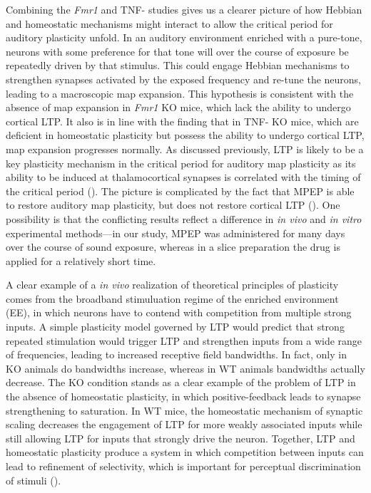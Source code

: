 Combining the \textit{Fmr1} and TNF-\textalpha{} studies gives us a clearer picture of how Hebbian and homeostatic mechanisms might interact to allow the critical period for auditory plasticity unfold. In an auditory environment enriched with a pure-tone, neurons with some preference for that tone will over the course of exposure be repeatedly driven by that stimulus. This could engage Hebbian mechanisms to strengthen synapses activated by the exposed frequency and re-tune the neurons, leading to a macroscopic map expansion. This hypothesis is consistent with the absence of map expansion in \textit{Fmr1} KO mice, which lack the ability to undergo cortical LTP. It also is in line with the finding that in TNF-\textalpha{} KO mice, which are deficient in homeostatic plasticity but possess the ability to undergo cortical LTP, map expansion progresses normally. As discussed previously, LTP is likely to be a key plasticity mechanism in the critical period for auditory map plasticity as its ability to be induced at thalamocortical synapses is correlated with the timing of the critical period (\cite{Chun2013}). The picture is complicated by the fact that MPEP is able to restore auditory map plasticity, but does not restore cortical LTP (\cite{Wilson2007}). One possibility is that the conflicting results reflect a difference in \textit{in vivo} and \textit{in vitro} experimental methods---in our study, MPEP was administered for many days over the course of sound exposure, whereas in a slice preparation the drug is applied for a relatively short time.

A clear example of a \textit{in vivo} realization of theoretical principles of plasticity comes from the broadband stimuluation regime of the enriched environment (EE), in which neurons have to contend with competition from multiple strong inputs. A simple plasticity model governed by LTP would predict that strong repeated stimulation would trigger LTP and strengthen inputs from a wide range of frequencies, leading to increased receptive field bandwidths. In fact, only in KO animals do bandwidths increase, whereas in WT animals bandwidths actually decrease. The KO condition stands as a clear example of the problem of LTP in the absence of homeostatic plasticity, in which positive-feedback leads to synapse strengthening to saturation. In WT mice, the homeostatic mechanism of synaptic scaling decreases the engagement of LTP for more weakly associated inputs while still allowing LTP for inputs that strongly drive the neuron. Together, LTP and homeostatic plasticity produce a system in which competition between inputs can lead to refinement of selectivity, which is important for perceptual discrimination of stimuli (\cite{Han2007}).

